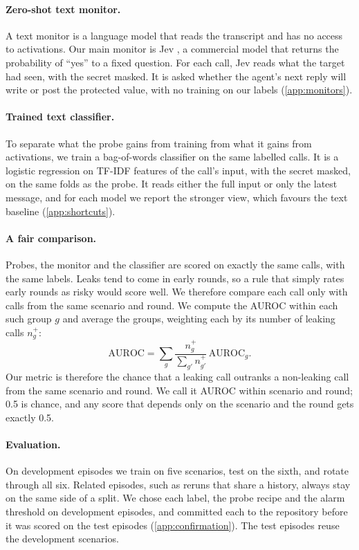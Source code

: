 \documentclass[letterpaper]{article} %
\begin{document}
\paragraph{Zero-shot text monitor.}
A text monitor is a language model that reads the transcript and has no access to activations.
Our main monitor is Jev \citep{typesafe2026jev}, a commercial model that returns the probability of ``yes'' to a fixed question.
For each call, Jev reads what the target had seen, with the secret masked.
It is asked whether the agent's next reply will write or post the protected value, with no training on our labels (\cref{app:monitors}).

\paragraph{Trained text classifier.}
To separate what the probe gains from training from what it gains from activations, we train a bag-of-words classifier on the same labelled calls.
It is a logistic regression on TF-IDF features of the call's input, with the secret masked, on the same folds as the probe.
It reads either the full input or only the latest message, and for each model we report the stronger view, which favours the text baseline (\cref{app:shortcuts}).

\paragraph{A fair comparison.}
Probes, the monitor and the classifier are scored on exactly the same calls, with the same labels.
Leaks tend to come in early rounds, so a rule that simply rates early rounds as risky would score well.
We therefore compare each call only with calls from the same scenario and round.
We compute the AUROC within each such group $g$ and average the groups, weighting each by its number of leaking calls $n^+_g$:
\begin{equation}
  \mathrm{AUROC} = \sum_g \frac{n^+_g}{\sum_{g'} n^+_{g'}}\, \mathrm{AUROC}_g .
  \label{eq:auroc}
\end{equation}
Our metric is therefore the chance that a leaking call outranks a non-leaking call from the same scenario and round.
We call it AUROC within scenario and round; 0.5 is chance, and any score that depends only on the scenario and the round gets exactly 0.5.

\paragraph{Evaluation.}
On development episodes we train on five scenarios, test on the sixth, and rotate through all six.
Related episodes, such as reruns that share a history, always stay on the same side of a split.
We chose each label, the probe recipe and the alarm threshold on development episodes, and committed each to the repository before it was scored on the test episodes (\cref{app:confirmation}).
The test episodes reuse the development scenarios.
\end{document}
